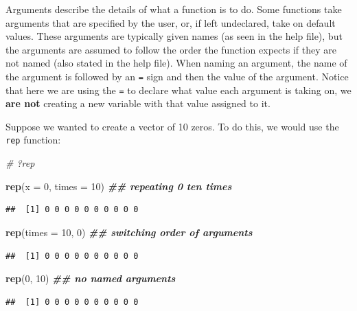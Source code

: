 \documentclass[
  10pt,
  letterpaper,
  twoside,
  openright]{book}
\newenvironment{Shaded}{\begin{snugshade}}{\end{snugshade}}
\newcommand{\AttributeTok}[1]{\textcolor[rgb]{0.13,0.29,0.53}{#1}}
\newcommand{\CommentTok}[1]{\textcolor[rgb]{0.56,0.35,0.01}{\textit{#1}}}
\newcommand{\DecValTok}[1]{\textcolor[rgb]{0.00,0.00,0.81}{#1}}
\newcommand{\DocumentationTok}[1]{\textcolor[rgb]{0.56,0.35,0.01}{\textbf{\textit{#1}}}}
\newcommand{\FunctionTok}[1]{\textcolor[rgb]{0.13,0.29,0.53}{\textbf{#1}}}
\newcommand{\NormalTok}[1]{#1}
\begin{document}
Arguments describe the details of what a function is to do. Some
functions take arguments that are specified by the user, or, if left
undeclared, take on default values. These arguments are typically given
names (as seen in the help file), but the arguments are assumed to
follow the order the function expects if they are not named (also stated
in the help file). When naming an argument, the name of the argument is
followed by an \texttt{=} sign and then the value of the argument.
Notice that here we are using the \texttt{=} to declare what value each
argument is taking on, we \textbf{are not} creating a new variable with
that value assigned to it.

Suppose we wanted to create a vector of 10 zeros. To do this, we would
use the \texttt{rep} function:

\begin{Shaded}
\begin{Highlighting}[]
\CommentTok{\# ?rep}

\FunctionTok{rep}\NormalTok{(}\AttributeTok{x =} \DecValTok{0}\NormalTok{, }\AttributeTok{times =} \DecValTok{10}\NormalTok{) }\DocumentationTok{\#\# repeating 0 ten times}
\end{Highlighting}
\end{Shaded}

\begin{verbatim}
##  [1] 0 0 0 0 0 0 0 0 0 0
\end{verbatim}

\begin{Shaded}
\begin{Highlighting}[]
\FunctionTok{rep}\NormalTok{(}\AttributeTok{times =} \DecValTok{10}\NormalTok{, }\DecValTok{0}\NormalTok{) }\DocumentationTok{\#\# switching order of arguments}
\end{Highlighting}
\end{Shaded}

\begin{verbatim}
##  [1] 0 0 0 0 0 0 0 0 0 0
\end{verbatim}

\begin{Shaded}
\begin{Highlighting}[]
\FunctionTok{rep}\NormalTok{(}\DecValTok{0}\NormalTok{, }\DecValTok{10}\NormalTok{) }\DocumentationTok{\#\# no named arguments}
\end{Highlighting}
\end{Shaded}

\begin{verbatim}
##  [1] 0 0 0 0 0 0 0 0 0 0
\end{verbatim}
\end{document}
